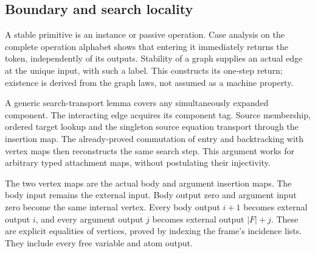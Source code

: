






\subsection{Boundary and search locality}

A stable primitive is an instance or passive operation. Case analysis
on the complete operation alphabet shows that entering it immediately returns
the token, independently of its outputs. Stability of a graph supplies an
actual edge at the unique input, with such a label. This constructs its
one-step return; existence is derived from the graph laws, not assumed as a
machine property.



A generic search-transport lemma covers any simultaneously expanded
component. The interacting edge acquires its component tag. Source membership,
ordered target lookup and the singleton source equation transport through the
insertion map. The already-proved commutation of entry and backtracking with
vertex maps then reconstructs the same search step. This argument works for
arbitrary typed attachment maps, without postulating their injectivity.


The two vertex maps are the actual body and argument insertion maps.
The body input remains the external input. Body output zero and argument
input zero become the same internal vertex. Every body output $i+1$ becomes
external output $i$, and every argument output $j$ becomes external output
$|F|+j$. These are explicit equalities of vertices, proved by indexing the
frame's incidence lists. They include every free variable and atom output.

